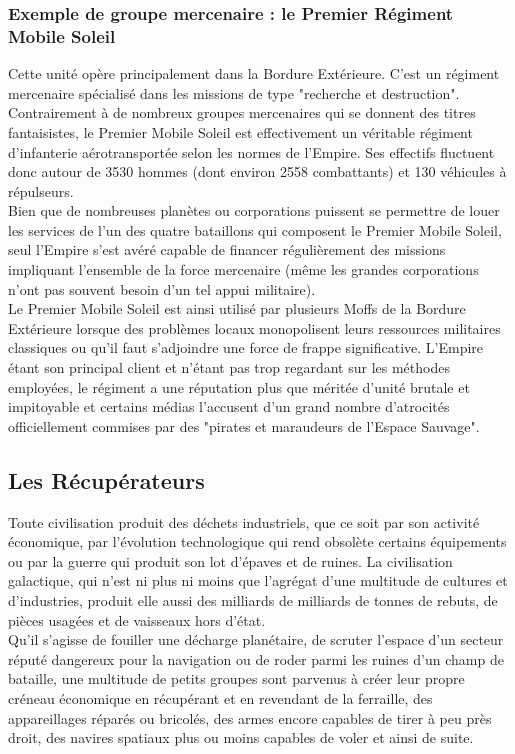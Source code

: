 \documentclass[twoside]{article}
\begin{document}
\subsubsection{Exemple de groupe mercenaire : le Premier Régiment Mobile Soleil}
Cette unité opère principalement dans la Bordure Extérieure. C'est un régiment mercenaire spécialisé dans les missions de type "recherche et destruction". Contrairement à de nombreux groupes mercenaires qui se donnent des titres fantaisistes, le Premier Mobile Soleil est effectivement un véritable régiment d'infanterie aérotransportée selon les normes de l'Empire. Ses effectifs fluctuent donc autour de 3530 hommes (dont environ 2558 combattants) et 130 véhicules à répulseurs.\\

Bien que de nombreuses planètes ou corporations puissent se permettre de louer les services de l'un des quatre bataillons qui composent le Premier Mobile Soleil, seul l'Empire s'est avéré capable de financer régulièrement des missions impliquant l'ensemble de la force mercenaire (même les grandes corporations n'ont pas souvent besoin d'un tel appui militaire).\\

Le Premier Mobile Soleil est ainsi utilisé par plusieurs Moffs de la Bordure Extérieure lorsque des problèmes locaux monopolisent leurs ressources militaires classiques ou qu'il faut s'adjoindre une force de frappe significative. L'Empire étant son principal client et n'étant pas trop regardant sur les méthodes employées, le régiment a une réputation plus que méritée d'unité brutale et impitoyable et certains médias l'accusent d'un grand nombre d'atrocités officiellement commises par des "pirates et maraudeurs de l'Espace Sauvage".

\subsection{Les Récupérateurs}
Toute civilisation produit des déchets industriels, que ce soit par son activité économique, par l'évolution technologique qui rend obsolète certains équipements ou par la guerre qui produit son lot d'épaves et de ruines. La civilisation galactique, qui n'est ni plus ni moins que l'agrégat d'une multitude de cultures et d'industries, produit elle aussi des milliards de milliards de tonnes de rebuts, de pièces usagées et de vaisseaux hors d'état.\\

Qu'il s'agisse de fouiller une décharge planétaire, de scruter l'espace d'un secteur réputé dangereux pour la navigation ou de roder parmi les ruines d'un champ de bataille, une multitude de petits groupes sont parvenus à créer leur propre créneau économique en récupérant et en revendant de la ferraille, des appareillages réparés ou bricolés, des armes encore capables de tirer à peu près droit, des navires spatiaux plus ou moins capables de voler et ainsi de suite.\\
\end{document}

